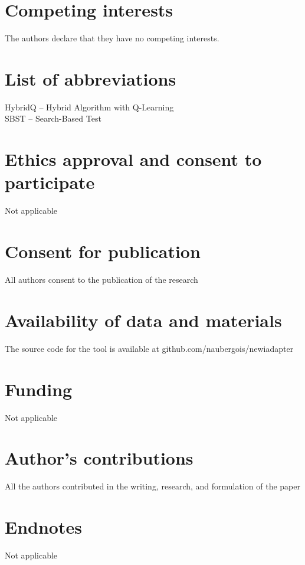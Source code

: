 \documentclass{bmcart}
\begin{document}
\begin{backmatter}

\section*{Competing interests}
  The authors declare that they have no competing interests.
  
\section*{List of abbreviations}
HybridQ – Hybrid Algorithm with Q-Learning \\
SBST – Search-Based Test

\section*{Ethics approval and consent to participate}
Not applicable

\section*{Consent for publication}
All authors consent to the publication of the research

\section*{Availability of data and materials}
The source code for the tool is available at github.com/naubergois/newiadapter

\section*{Funding}
Not applicable

\section*{Author's contributions}
All the authors contributed in the writing, research, and formulation of the paper

\section*{Endnotes}  
Not applicable  


\end{backmatter}
\end{document}
